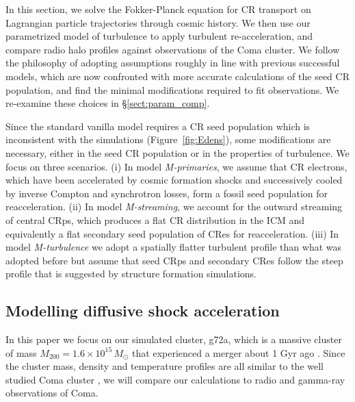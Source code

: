 \documentclass[fleqn,usenatbib,useAMS]{mnras}
\begin{document}
In this section, we solve the Fokker-Planck equation for CR transport on
Lagrangian particle trajectories through cosmic history. We then use our
parametrized model of turbulence to apply turbulent re-acceleration, and
compare radio halo profiles against observations of the Coma cluster. We follow
the philosophy of adopting assumptions roughly in line with previous successful
models, which are now confronted with more accurate calculations of the seed CR
population, and find the minimal modifications required to fit observations. We
re-examine these choices in \S\ref{sect:param_comp}.

Since the standard vanilla model requires a CR seed population which is
inconsistent with the simulations (Figure~\ref{fig:Edens}), some modifications are
necessary, either in the seed CR population or in the properties of
turbulence. We focus on three scenarios. (i) In model {\em M-primaries}, we
assume that CR electrons, which have been accelerated by cosmic formation shocks
and successively cooled by inverse Compton and synchrotron losses, form a fossil
seed population for reacceleration. (ii) In model {\em M-streaming}, we account
for the outward streaming of central CRps, which produces a flat CR distribution
in the ICM and equivalently a flat secondary seed population of CRes for
reacceleration. (iii) In model {\em M-turbulence} we adopt a spatially flatter
turbulent profile than what was adopted before but assume that seed CRps and
secondary CRes follow the steep profile that is suggested by structure formation
simulations.

\subsection{Modelling diffusive shock acceleration}
\label{sec:cosmo_sim}
In this paper we focus on our simulated cluster, g72a, which is a
massive cluster of mass $M_{200}=1.6\times10^{15}\,M_\odot$ that
experienced a merger about 1 Gyr ago
\citep{2009MNRAS.399..497D}. Since the cluster mass, density and
temperature profiles are all similar to the well studied Coma cluster
\citep{2007MNRAS.378..385P,pinzke10}, we will compare our calculations
to radio and gamma-ray observations of Coma.
\end{document}
